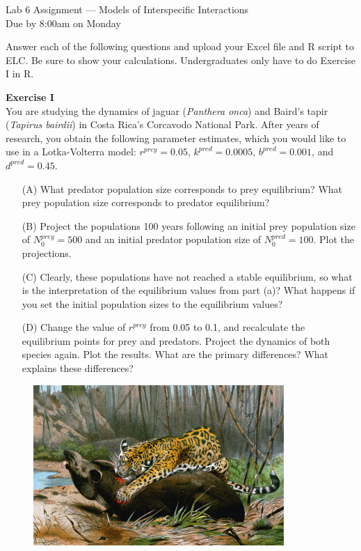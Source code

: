 \documentclass[12pt]{article}\usepackage[]{graphicx}\usepackage[]{xcolor}
\begin{document}
{
  \Large
  \centering
  Lab 6 Assignment --- Models of Interspecific Interactions \\
  Due by 8:00am on Monday \par
}

Answer each of the following questions and upload your Excel file and
R script to ELC. Be sure to show your calculations. Undergraduates
only have to do Exercise I in R.  \\


\vspace{6pt}

{\bf Exercise I \\}
You are studying the dynamics of jaguar (\textit{Panthera onca}) and Baird's
tapir (\textit{Tapirus bairdii}) in Costa Rica's Corcavodo National Park. After
years of research, you obtain the following parameter estimates, which
you would like to use in a Lotka-Volterra model: $r^{prey}=0.05$,
$k^{pred}=0.0005$, $b^{pred}=0.001$, and $d^{pred}=0.45$.  
\begin{enumerate}
  \item[(A)] What predator population size corresponds to prey equilibrium?
    What prey population size corresponds to predator equilibrium? 
  \item[(B)] Project the populations 100 years following an initial prey
    population size of $N_0^{prey}=500$ and an initial predator
    population size of $N_0^{pred}=100$. Plot the projections.  
  \item[(C)] Clearly, these populations have not reached a stable
    equilibrium, so what is the interpretation of the equilibrium
    values from part (a)? What happens if you set the initial
    population sizes to the equilibrium values?  
  \item[(D)] Change the value of $r^{prey}$ from 0.05 to 0.1,
    and recalculate the equilibrium points for prey and
    predators. Project the dynamics of both species again. Plot the
    results. What are the primary differences?  What explains these
    differences? 
\end{enumerate}

\vspace{12pt}

\begin{figure}[h!]
  \centering
  \includegraphics[width=0.85\textwidth]{jaguar_killing_tapir}
  \label{fig:jag-tapir}
\end{figure}
\end{document}
